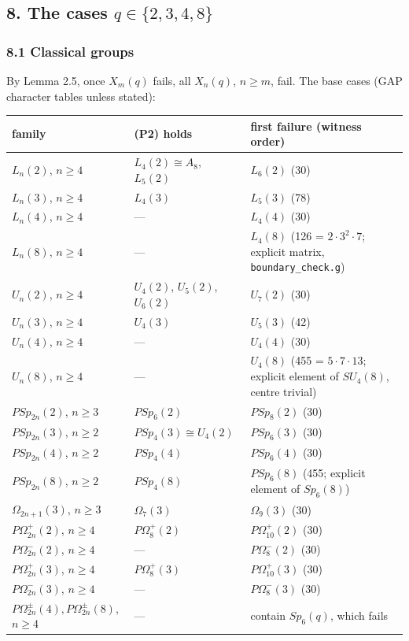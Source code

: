 \documentclass[11pt,a4paper]{article}
\begin{document}
\subsection{\texorpdfstring{8. The cases
\(q\in\{2,3,4,8\}\)}{8. The cases q\textbackslash in\textbackslash\{2,3,4,8\textbackslash\}}}\label{the-cases-qin2348}

\subsubsection{8.1 Classical groups}\label{classical-groups}

By Lemma 2.5, once \(X_m(q)\) fails, all \(X_n(q)\), \(n\ge m\), fail.
The base cases (GAP character tables unless stated):

\begin{center}\small\begin{tabularx}{\linewidth}{ll>{\raggedright\arraybackslash}X}\toprule
family & (P2) holds & first failure (witness order) \\
\midrule
\(L_n(2)\), \(n\ge4\) & \(L_4(2)\cong A_8\), \(L_5(2)\) & \(L_6(2)\) (30) \\
\(L_n(3)\), \(n\ge4\) & \(L_4(3)\) & \(L_5(3)\) (78) \\
\(L_n(4)\), \(n\ge4\) & --- & \(L_4(4)\) (30) \\
\(L_n(8)\), \(n\ge4\) & --- & \(L_4(8)\) (126 = \(2\cdot3^2\cdot7\); explicit matrix, \texttt{boundary\_check.g}) \\
\(U_n(2)\), \(n\ge4\) & \(U_4(2)\), \(U_5(2)\), \(U_6(2)\) & \(U_7(2)\) (30) \\
\(U_n(3)\), \(n\ge4\) & \(U_4(3)\) & \(U_5(3)\) (42) \\
\(U_n(4)\), \(n\ge4\) & --- & \(U_4(4)\) (30) \\
\(U_n(8)\), \(n\ge4\) & --- & \(U_4(8)\) (455 = \(5\cdot7\cdot13\); explicit element of \(SU_4(8)\), centre trivial) \\
\(PSp_{2n}(2)\), \(n\ge3\) & \(PSp_6(2)\) & \(PSp_8(2)\) (30) \\
\(PSp_{2n}(3)\), \(n\ge2\) & \(PSp_4(3)\cong U_4(2)\) & \(PSp_6(3)\) (30) \\
\(PSp_{2n}(4)\), \(n\ge2\) & \(PSp_4(4)\) & \(PSp_6(4)\) (30) \\
\(PSp_{2n}(8)\), \(n\ge2\) & \(PSp_4(8)\) & \(PSp_6(8)\) (455; explicit element of \(Sp_6(8)\)) \\
\(\Omega_{2n+1}(3)\), \(n\ge3\) & \(\Omega_7(3)\) & \(\Omega_9(3)\) (30) \\
\(P\Omega^+_{2n}(2)\), \(n\ge4\) & \(P\Omega^+_8(2)\) & \(P\Omega^+_{10}(2)\) (30) \\
\(P\Omega^-_{2n}(2)\), \(n\ge4\) & --- & \(P\Omega^-_8(2)\) (30) \\
\(P\Omega^+_{2n}(3)\), \(n\ge4\) & \(P\Omega^+_8(3)\) & \(P\Omega^+_{10}(3)\) (30) \\
\(P\Omega^-_{2n}(3)\), \(n\ge4\) & --- & \(P\Omega^-_8(3)\) (30) \\
\(P\Omega^\pm_{2n}(4),P\Omega^\pm_{2n}(8)\), \(n\ge4\) & --- & contain \(Sp_6(q)\), which fails \\
\bottomrule\end{tabularx}\end{center}
\end{document}
